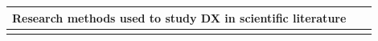 \documentclass[english, 12pt, a4paper, sci, utf8, a-1b, online]{aaltothesis}
\begin{document}
\renewcommand{\arraystretch}{1.5}
\begin{center}
  \begin{longtable}{p{0.3\linewidth}p{0.6\linewidth}}
    \multicolumn{2}{l}{\textbf{Research methods used to study DX in scientific literature}}                                                                                                                                                                                                                                                                                                                                                                                                                                                                                                                                                                                                                                                                                                                                                                                                                                                                                                                                                \\
    \hline                                                                                                                                                                                                                                                                                                                                                                                                                                                                                                                                                                                                                                                                                                                                                                                                                                                                                                                                                                                            \\

\end{longtable}
\end{center}
\end{document}

